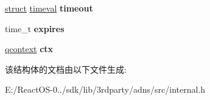 \begin{DoxyCompactItemize}
\item 
\mbox{\label{structadns____query_a5c4398661ef58eec29f601bafd3bdeb8}} 
\hyperlink{interfacestruct}{struct} \hyperlink{structtimeval}{timeval} {\bfseries timeout}
\item 
\mbox{\label{structadns____query_a9edb72996bad9ca687b696742ee72b57}} 
time\+\_\+t {\bfseries expires}
\item 
\mbox{\label{structadns____query_af37443cb7d62bce9e37ed11d90df10dd}} 
\hyperlink{structqcontext}{qcontext} {\bfseries ctx}
\end{DoxyCompactItemize}


该结构体的文档由以下文件生成\+:\begin{DoxyCompactItemize}
\item 
E\+:/\+React\+O\+S-\/0../sdk/lib/3rdparty/adns/src/internal.\+h\end{DoxyCompactItemize}
